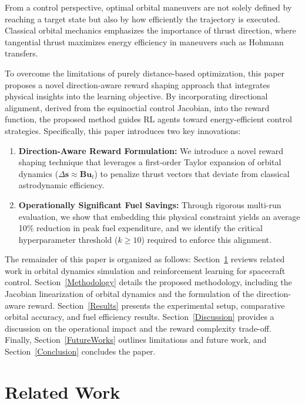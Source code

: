 \documentclass[paper]{ieice}
\begin{document}
From a control perspective, optimal orbital maneuvers are not solely defined by reaching a target state but also by how efficiently the trajectory is executed. Classical orbital mechanics emphasizes the importance of thrust direction, where tangential thrust maximizes energy efficiency in maneuvers such as Hohmann transfers.

To overcome the limitations of purely distance-based optimization, this paper proposes a novel direction-aware reward shaping approach that integrates physical insights into the learning objective. By incorporating directional alignment, derived from the equinoctial control Jacobian, into the reward function, the proposed method guides RL agents toward energy-efficient control strategies. Specifically, this paper introduces two key innovations:

\begin{enumerate}
    \item \textbf{Direction-Aware Reward Formulation:} We introduce a novel reward shaping technique that leverages a first-order Taylor expansion of orbital dynamics ($\Delta \mathbf{s} \approx \mathbf{B} \mathbf{u}_t$) to penalize thrust vectors that deviate from classical astrodynamic efficiency.
    \item \textbf{Operationally Significant Fuel Savings:} Through rigorous multi-run evaluation, we show that embedding this physical constraint yields an average 10\% reduction in peak fuel expenditure, and we identify the critical hyperparameter threshold ($k \ge 10$) required to enforce this alignment.
\end{enumerate}

The remainder of this paper is organized as follows: Section~\ref{RelatedWork} reviews related work in orbital dynamics simulation and reinforcement learning for spacecraft control. Section~\ref{Methodology}  details the proposed methodology, including the Jacobian linearization of orbital dynamics and the formulation of the direction-aware reward. Section~\ref{Results}  presents the experimental setup, comparative orbital accuracy, and fuel efficiency results. Section~\ref{Discussion}  provides a discussion on the operational impact and the reward complexity trade-off. Finally, Section~\ref{FutureWorks} outlines limitations and future work, and Section~\ref{Conclusion}  concludes the paper.

\section{Related Work}
\label{RelatedWork}
\end{document}
